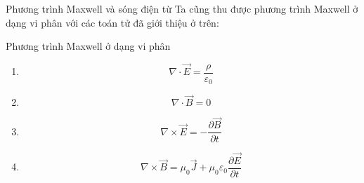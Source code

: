 \documentclass[8pt]{beamer}
\begin{document}
\begin{frame}{Phương trình Maxwell và sóng điện từ}
Ta cũng thu được phương trình Maxwell ở dạng vi phân với các toán tử đã giới thiệu ở trên:
\begin{block}{Phương trình Maxwell ở dạng vi phân}
\begin{enumerate}
	\item $$\nabla\cdot\overrightarrow{E}=\frac{\rho}{\varepsilon_{0}}$$
	\item $$\nabla \cdot \overrightarrow{B}=0$$
	\item $$\nabla \times \overrightarrow{E}=-\frac{\partial \overrightarrow{B}}{\partial t}$$
	\item $$\nabla \times \overrightarrow{B}=\mu_{0}\overrightarrow{J}+\mu_{0}\varepsilon_{0}\frac{\partial \overrightarrow{E}}{\partial t}$$
\end{enumerate}
\end{block}
\end{frame}
\end{document}
